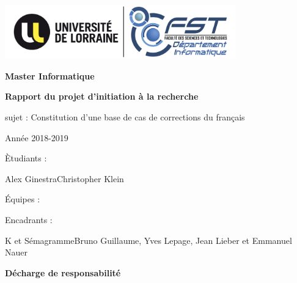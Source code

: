 \documentclass[11pt]{article}
\begin{document}
\begin{center}
\includegraphics[width=10cm]{logoULFST.jpg} %
\end{center}

\begin{center}
\thispagestyle{empty}
{\bfseries \large Master Informatique}
\end{center}

\vspace*{70mm}
\begin{center}
	{\bfseries \Huge Rapport du projet d'initiation \`{a} la recherche}
\end{center}
\vspace*{10mm}
\begin{center}
{\large sujet : Constitution d'une base de cas de corrections du fran\c{c}ais}
\end{center}
\begin{center}
{\large Ann\'ee 2018-2019}
\end{center}



\vspace*{60mm}
\begin{multicols}{2}
\begin{multicols}{2}
	\begin{flushright}
		\`{E}tudiants :
	\end{flushright}
		\vfill\null\columnbreak
	\begin{flushleft}
		Alex Ginestra\newline Christopher Klein
	\end{flushleft}
\end{multicols}
\vfill\null\columnbreak
\begin{multicols}{2}
	\begin{flushright}
		\'{E}quipes :
	\end{flushright}
	\begin{flushright}
		Encadrants :
	\end{flushright}
	\vfill\null\columnbreak
	\begin{flushleft}
	K et S\'emagramme\newline Bruno Guillaume, Yves Lepage, Jean Lieber et Emmanuel Nauer
	\end{flushleft}
\end{multicols}
\end{multicols}
\cleardoublepage
\cleardoublepage
\newpage
\strut
\thispagestyle{empty}
\newpage
\thispagestyle{empty}
\begin{center}
{\bfseries \huge D\'echarge de responsabilit\'e}
\end{center}
\vspace*{10mm}
\end{document}

